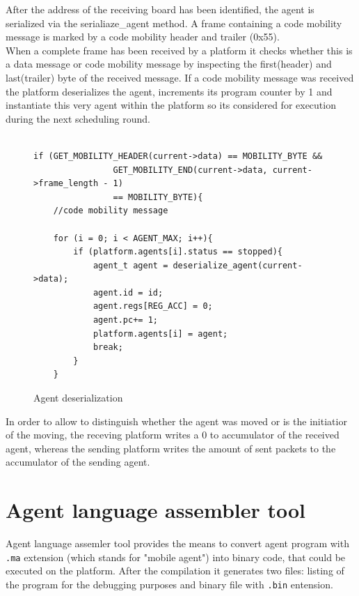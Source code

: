 \documentclass{scrreprt}
\begin{document}
After the address of the receiving board has been identified, the agent is serialized via the serialiaze_agent method. 
A frame containing a code mobility message is marked by a code mobility header and trailer (0x55).\\

\noindent
When a complete frame has been received by a platform it checks whether this is a data message or code mobility message
by inspecting the first(header) and last(trailer) byte of the received message. If a code mobility message was received
the platform deserializes the agent, increments its program counter by 1 and instantiate this very agent within the platform
so its considered for execution during the next scheduling round. \\

\begin{figure}[!htb]
\lstset{language=C, tabsize=2}
\begin{lstlisting}[frame=single]
	
if (GET_MOBILITY_HEADER(current->data) == MOBILITY_BYTE && 
				GET_MOBILITY_END(current->data, current->frame_length - 1)
				== MOBILITY_BYTE){
	//code mobility message

	for (i = 0; i < AGENT_MAX; i++){
		if (platform.agents[i].status == stopped){
			agent_t agent = deserialize_agent(current->data);
			agent.id = id;
			agent.regs[REG_ACC] = 0;
			agent.pc+= 1;
			platform.agents[i] = agent;
			break;
		}
	}

\end{lstlisting}
\caption{Agent deserialization}
\label{fig:agent-des}
\end{figure}


\noindent
In order to allow to distinguish whether the agent 
was moved or is the initiatior of the moving, the receving platform writes a 0 to accumulator of the received agent,
whereas the sending platform writes the amount of sent packets to the accumulator of the sending agent. 


\section{Agent language assembler tool}

Agent language assemler tool provides the means to convert agent program with \texttt{.ma} extension (which stands for "mobile agent")
into binary code, that could be executed on the platform.
After the compilation it generates two files: listing of the program for the debugging purposes and binary file with \texttt{.bin} entension.
\end{document}

